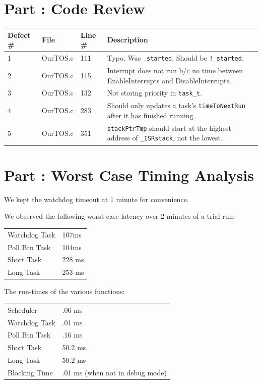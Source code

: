 \documentclass{article}
\newcounter{partNum}
\newcommand{\partNum}{%
        \stepcounter{partNum}%
        \thepartNum}
\newcommand{\sectPart}[1]{\section*{Part \partNum: #1}}
\begin{document}

\sectPart{Code Review}


\begin{tabular}{| l | l | l | p{25em} |}
        \hline
        \textbf{Defect \#} & \textbf{File} & \textbf{Line \#} & \textbf{Description} \\ \hline
        1 & OurTOS.c & 111 & Typo. Was \texttt{\_started}. Should be \texttt{!\_started}. \\ \hline
        2 & OurTOS.c & 115 & Interrupt does not run b/c no time between EnableInterrupts and DisableInterrupts. \\ \hline
        3  & OurTOS.c & 132 & Not storing priority in \texttt{task\_t}. \\ \hline
        4 & OurTOS.c & 283 & Should only updates a task's \texttt{timeToNextRun} after it has finished running. \\ \hline
        5 & OurTOS.c & 351 & \texttt{stackPtrTmp} should start at the highest address of \texttt{\_ISRstack}, not the lowest. \\ \hline
\end{tabular}


\sectPart{Worst Case Timing Analysis}

We kept the watchdog timeout at 1 minute for convenience.

We observed the following worst case latency over 2 minutes of a trial run:

\vspace{1em}

\begin{tabular}{l | l}
Watchdog Task & 107ms \\
Poll Btn Task & 104ms \\
Short Task & 228 ms \\
Long Task & 253 ms \\ 
\end{tabular}

\vspace{1em}

The run-times of the various functions:

\vspace{1em}

\begin{tabular}{l | l}
Scheduler & .06 ms \\
Watchdog Task & .01 ms \\
Poll Btn Task & .16 ms \\
Short Task & 50.2 ms \\
Long Task & 50.2 ms \\ 
Blocking Time & .01 ms (when not in debug mode) \\
\end{tabular}
\end{document}
